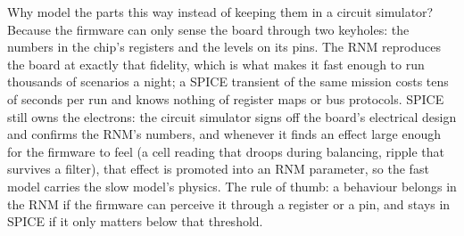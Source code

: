 \documentclass[11pt]{article}
\begin{document}
Why model the parts this way instead of keeping them in a circuit
simulator?  Because the firmware can only sense the board through
two keyholes: the numbers in the chip's registers and the levels on
its pins.  The RNM reproduces the board at exactly that fidelity,
which is what makes it fast enough to run thousands of scenarios a
night; a SPICE transient of the same mission costs tens of seconds
per run and knows nothing of register maps or bus protocols.  SPICE
still owns the electrons: the circuit simulator signs off the
board's electrical design and confirms the RNM's numbers, and
whenever it finds an effect large enough for the firmware to feel
(a cell reading that droops during balancing, ripple that survives
a filter), that effect is promoted into an RNM parameter, so the
fast model carries the slow model's physics.  The rule of thumb: a
behaviour belongs in the RNM if the firmware can perceive it
through a register or a pin, and stays in SPICE if it only matters
below that threshold.
\end{document}
